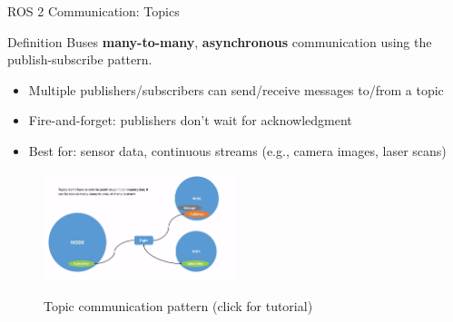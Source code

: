 \begin{frame}{ROS 2 Communication: Topics}
    \begin{block}{Definition}
        Buses \textbf{many-to-many}, \textbf{asynchronous} communication using the publish-subscribe pattern.
        \begin{itemize}
            \item Multiple publishers/subscribers can send/receive messages to/from a topic
            \item Fire-and-forget: publishers don't wait for acknowledgment
            \item Best for: sensor data, continuous streams (e.g., camera images, laser scans)
        \end{itemize}
    \end{block}

    \begin{figure}
        \centering
        \href{https://docs.ros.org/en/foxy/Tutorials/Beginner-CLI-Tools/Understanding-ROS2-Topics/Understanding-ROS2-Topics.html}{%
            \includegraphics[width=0.5\textwidth]{img/ros2/ros2_communication.png}%
        }
        \caption{Topic communication pattern (click for tutorial)}
    \end{figure}
\end{frame}

